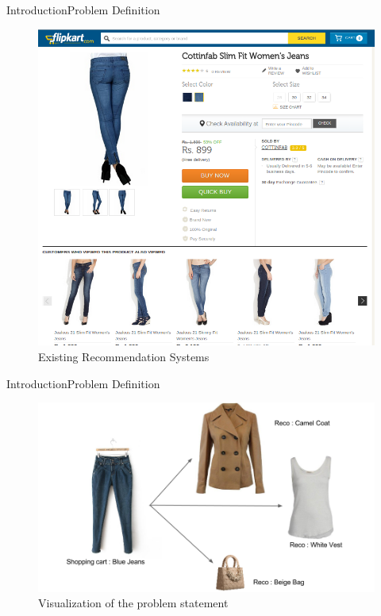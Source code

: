 \documentclass[10pt]{beamer}
\begin{document}
\begin{frame}{Introduction}{Problem Definition}
\begin{figure}[t]
    \centering
    \includegraphics[height=\dimexpr11\textheight/16\relax]{reco_exst_1}
    \caption{Existing Recommendation Systems}
  \end{figure}
\end{frame}



\begin{frame}{Introduction}{Problem Definition}
\begin{figure}[t]
    \centering
    \includegraphics[height=\dimexpr11\textheight/16\relax]{Untitled}
    \caption{Visualization of the problem statement}
  \end{figure}
\end{frame}
\end{document}
